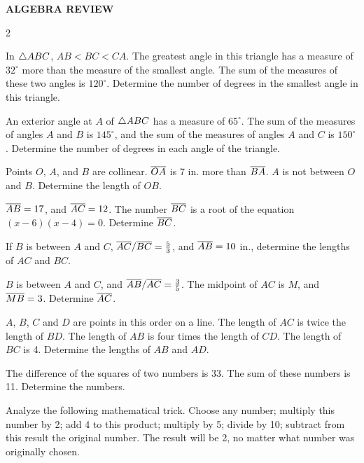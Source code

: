 \documentclass[11pt]{book}
\begin{document}
\begin{center}\bfseries ALGEBRA REVIEW\end{center}\nopagebreak
\begin{multicols}{2}
\begin{exlist}
\item In $\triangle ABC$, $AB < BC < CA$. The greatest angle in this triangle has a
  measure of $32^\circ$ more than the measure of the smallest angle. The sum of
  the measures of these two angles is $120^\circ$. Determine the number of
  degrees in the smallest angle in this triangle.
\item An exterior angle at $A$ of $\triangle ABC$ has a measure of $65^\circ$. The
  sum of the measures of angles $A$ and $B$ is $145^\circ$, and the sum of the
  measures of angles $A$ and $C$ is $150^\circ$. Determine the number of
  degrees in each angle of the triangle.
\item Points $O$, $A$, and $B$ are collinear. $\overline{OA}$ is 7 in. more than
  $\overline{BA}$. $A$ is not between $O$ and $B$. Determine the length of $OB$.
\item $\overline{AB} = 17$, and $\overline{AC} = 12$. The number $\overline{BC}$ is a root of the
  equation $(x-6)(x-4) = 0$. Determine $\overline{BC}$.
\item If $B$ is between $A$ and $C$, $\overline{AC}/\overline{BC} = \frac{5}{3}$, and
  $\overline{AB} = 10$ in., determine the lengths of $AC$ and $BC$.
\item $B$ is between $A$ and $C$, and $\overline{AB}/\overline{AC} = \frac{3}{5}$. The
  midpoint of $AC$ is $M$, and $\overline{MB} = 3$. Determine $\overline{AC}$.
\item[\stex 7.] $A$, $B$, $C$ and $D$ are points in this order on a line. The
  length of $AC$ is twice the length of $BD$. The length of $AB$ is four times
  the length of $CD$. The length of $BC$ is 4. Determine the lengths of $AB$
  and $AD$.
\item[\stex 8.] The difference of the squares of two numbers is 33. The sum of
  these numbers is 11. Determine the numbers.
\item[\stex 9.] Analyze the following mathematical trick. Choose any number;
  multiply this number by 2; add 4 to this product; multiply by 5; divide by
  10; subtract from this result the original number. The result will be 2, no
  matter what number was originally chosen.
\end{exlist}
\end{multicols}
\end{document}
